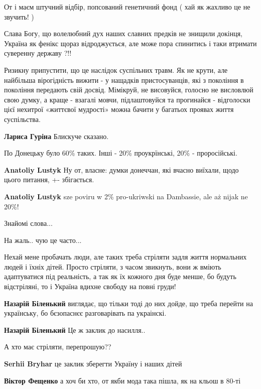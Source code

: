 \begin{itemize}
От і маєм штучний відбір, попсований генетичний фонд ( хай як жахливо це не
звучить! )

Слава Богу, що волелюбний дух наших славних предків не знищили докінця, Україна
як фенікс щораз відроджується, але може пора спинитись і таки втримати
суверенну державу ?!!


Ризикну припустити, що це наслідок суспільних травм. Як не крути, але найбільша
вірогідність вижити - у нащадків пристосуванців, які з покоління в покоління
передають свій досвід. Мімікруй, не висовуйся, голосно не висловлюй свою думку,
а краще - взагалі мовчи, підлаштовуйся та прогинайся - відголоски цієї нехитрої
«життєвої мудрості» можна бачити у багатьох проявах життя суспільства.

\textbf{Лариса Гуріна} Блискуче сказано.

По Донецьку було 60\% таких. Інші - 20\% проукрїнські, 20\% - проросійські.


\textbf{Anatoliy Lustyk} Ну от, власне: думки донеччан, які вчасно виїхали, щодо цього питання, +- збігається.

\textbf{Anatoliy Lustyk} sze poviru w 2\% pro-ukriwski na Dambassie, ale aż nijak ne 20\%!

Знайомі слова...

На жаль.. чую це часто...


Нехай мене пробачать люди, але таких треба стріляти задля життя нормальних
людей і їхніх дітей. Просто стріляти, з часом звикнуть, вони ж вміють
адаптуватися під реальність, а так як їх кожного дня буде менше, бо будуть
відстріляні, то і Україна вдихне свободу на повні груди!

\begin{itemize} %
\textbf{Назарій Біленький} виглядає, що тільки тоді до них дойде, що треба перейти на українську, бо бєзопаснєє разговарівать па украінскі.

\textbf{Назарій Біленький} Це ж заклик до насилля..

А хто має стріляти, перепрошую??

\textbf{Serhii Bryhar} це заклик зберегти Україну і наших дітей

\textbf{Віктор Фещенко} а хоч би хто, от якби мода така пішла, як на кльош в 80-ті


\end{itemize}
\end{itemize}
